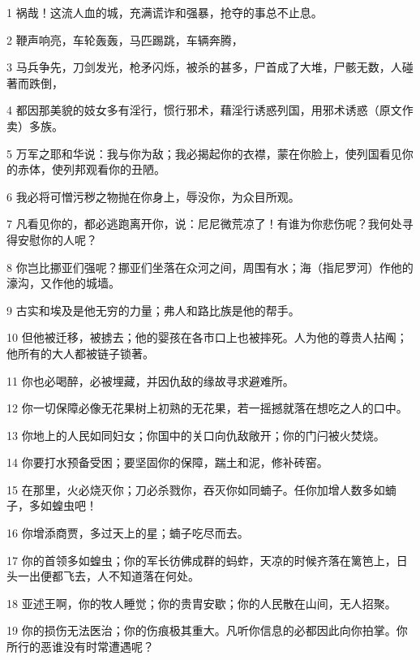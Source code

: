 \par 1 祸哉！这流人血的城，充满谎诈和强暴，抢夺的事总不止息。
\par 2 鞭声响亮，车轮轰轰，马匹踢跳，车辆奔腾，
\par 3 马兵争先，刀剑发光，枪矛闪烁，被杀的甚多，尸首成了大堆，尸骸无数，人碰著而跌倒，
\par 4 都因那美貌的妓女多有淫行，惯行邪术，藉淫行诱惑列国，用邪术诱惑（原文作卖）多族。
\par 5 万军之耶和华说：我与你为敌；我必揭起你的衣襟，蒙在你脸上，使列国看见你的赤体，使列邦观看你的丑陋。
\par 6 我必将可憎污秽之物抛在你身上，辱没你，为众目所观。
\par 7 凡看见你的，都必逃跑离开你，说：尼尼微荒凉了！有谁为你悲伤呢？我何处寻得安慰你的人呢？
\par 8 你岂比挪亚们强呢？挪亚们坐落在众河之间，周围有水；海（指尼罗河）作他的濠沟，又作他的城墙。
\par 9 古实和埃及是他无穷的力量；弗人和路比族是他的帮手。
\par 10 但他被迁移，被掳去；他的婴孩在各市口上也被摔死。人为他的尊贵人拈阄；他所有的大人都被链子锁著。
\par 11 你也必喝醉，必被埋藏，并因仇敌的缘故寻求避难所。
\par 12 你一切保障必像无花果树上初熟的无花果，若一摇撼就落在想吃之人的口中。
\par 13 你地上的人民如同妇女；你国中的关口向仇敌敞开；你的门闩被火焚烧。
\par 14 你要打水预备受困；要坚固你的保障，踹土和泥，修补砖窑。
\par 15 在那里，火必烧灭你；刀必杀戮你，吞灭你如同蝻子。任你加增人数多如蝻子，多如蝗虫吧！
\par 16 你增添商贾，多过天上的星；蝻子吃尽而去。
\par 17 你的首领多如蝗虫；你的军长彷佛成群的蚂蚱，天凉的时候齐落在篱笆上，日头一出便都飞去，人不知道落在何处。
\par 18 亚述王啊，你的牧人睡觉；你的贵胄安歇；你的人民散在山间，无人招聚。
\par 19 你的损伤无法医治；你的伤痕极其重大。凡听你信息的必都因此向你拍掌。你所行的恶谁没有时常遭遇呢？


